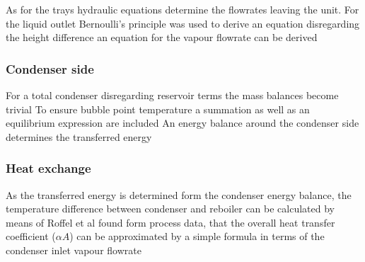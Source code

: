         As for the trays hydraulic equations determine the flowrates leaving the unit. For the liquid
        outlet Bernoulli's principle was used to derive an equation
        disregarding the height difference an equation for the vapour flowrate can be derived

    \subsubsection{Condenser side}
        For a total condenser disregarding reservoir terms the mass balances become trivial
        To ensure bubble point temperature a summation as well as an equilibrium expression are included
        An energy balance around the condenser side determines the transferred energy

    \subsubsection{Heat exchange}
        As the transferred energy is determined form the condenser energy balance, the temperature
        difference between condenser and reboiler can be calculated by means of
        Roffel et al \cite{Roffel.2000} found form process data, that the overall heat transfer coefficient ($\alpha A$)
        can be approximated by a simple formula in terms of the condenser inlet vapour flowrate



